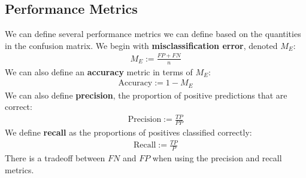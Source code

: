 \documentclass[12pt, a4paper]{article}
\theoremstyle{definition}
\begin{document}
	\subsection{Performance Metrics}
	We can define several performance metrics we can define based on the quantities
	in the confusion matrix. We begin with \textbf{misclassification error},
	denoted $M_E$:
	\begin{align*}
		M_E := \frac{FP + FN}{n}
	\end{align*}
	We can also define an \textbf{accuracy} metric in terms of $M_E$:
	\begin{align*}
		\text{Accuracy} := 1 - M_E
	\end{align*}
	We can also define \textbf{precision}, the proportion of positive predictions
	that are correct:
	\begin{align*}
		\text{Precision} := \frac{TP}{PP}
	\end{align*}
	We define \textbf{recall} as the proportions of positives classified correctly:
	\begin{align*}
		\text{Recall} := \frac{TP}{P}
	\end{align*}
	There is a tradeoff between $FN$ and $FP$ when using the precision and recall
	metrics.
\end{document}
